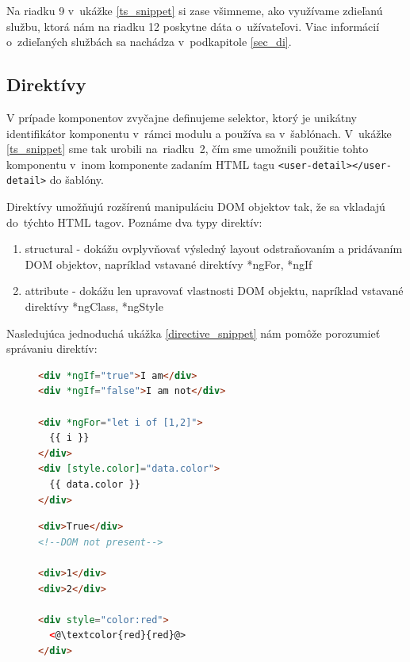 \documentclass[
  digital, %
  twoside, %
  notable,   %
  nolof,   %
  nolot,   %
]{fithesis3}
\begin{document}
Na riadku 9 v~ukážke \ref{ts_snippet} si zase všimneme, ako využívame zdieľanú službu, ktorá nám na riadku 12 poskytne dáta o~užívateľovi. Viac informácií o~zdieľaných službách sa nachádza v~podkapitole \ref{sec_di}.

\subsection{Direktívy}
\label{sec_directives}
V prípade komponentov zvyčajne definujeme selektor, ktorý je unikátny identifikátor komponentu v~rámci modulu a používa sa v~šablónach. V~ukážke \ref{ts_snippet} sme tak urobili na~riadku~2, čím sme umožnili použitie tohto komponentu v~inom komponente zadaním HTML tagu \texttt{<user-detail></user-detail>} do šablóny.

Direktívy umožňujú rozšírenú manipuláciu DOM objektov tak, že sa vkladajú do~týchto HTML tagov. Poznáme dva typy direktív\cite{angular}:
\begin{enumerate}
\item structural - dokážu ovplyvňovať výsledný layout odstraňovaním a pridávaním DOM objektov, napríklad vstavané direktívy *ngFor, *ngIf
\item attribute - dokážu len upravovať vlastnosti DOM objektu, napríklad vstavané direktívy *ngClass, *ngStyle
\end{enumerate}

Nasledujúca jednoduchá ukážka \ref{directive_snippet} nám pomôže porozumieť správaniu direktív:
\begin{figure}[H]
 \centering
 \begin{minipage}{.59\textwidth}

  \centering
  \begin{lstlisting}[language=HTML,caption={Direktívy použité v šalóne (vľavo) a ako ich vo~výsledku vníma prehliadač (vpravo)},label=directive_snippet]
<div *ngIf="true">I am</div>
<div *ngIf="false">I am not</div>

<div *ngFor="let i of [1,2]">
  {{ i }}
</div>
<div [style.color]="data.color">
  {{ data.color }}
</div>
  \end{lstlisting}

 \end{minipage}
 \begin{minipage}{.39\textwidth}

  \centering
  \begin{lstlisting}[language=HTML,numbers=none,xleftmargin=0em]
<div>True</div>
<!--DOM not present-->

<div>1</div>
<div>2</div>

<div style="color:red">
  <@\textcolor{red}{red}@>
</div>
  \end{lstlisting}
 
 \end{minipage}
\end{figure}
\end{document}
